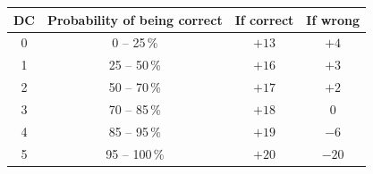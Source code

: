 \begin{center}
\begin{tabular}{|c|c|c|c|}
\hline
\rowcolor{paper}
\textbf{DC} & \textbf{Probability of being correct} & \textbf{If correct} & \textbf{If wrong}\\
\hline
0 & 0 -- 25\,\%   & $+13$ & $+4$\\
1 & 25 -- 50\,\%  & $+16$ & $+3$\\
2 & 50 -- 70\,\%  & $+17$ & $+2$\\
3 & 70 -- 85\,\%  & $+18$ & $0$\\
4 & 85 -- 95\,\%  & $+19$ & $-6$\\
5 & 95 -- 100\,\% & $+20$ & $-20$\\
\hline
\end{tabular}
\end{center}
